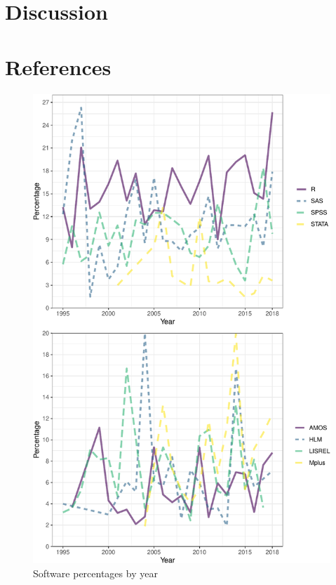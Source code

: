 \documentclass[english,,man]{apa6}
\theoremstyle{definition}
\theoremstyle{definition}
\theoremstyle{definition}
\theoremstyle{remark}
\begin{document}
\hypertarget{discussion}{%
\section{Discussion}\label{discussion}}

\newpage

\hypertarget{references}{%
\section{References}\label{references}}

\setlength{\parindent}{-0.5in}
\setlength{\leftskip}{0.5in}

\begin{figure}
\centering
\includegraphics{software_files/figure-latex/software-year-at1-1.pdf}
\caption{\label{fig:software-year-at1}Software percentages by year}
\end{figure}
\end{document}
